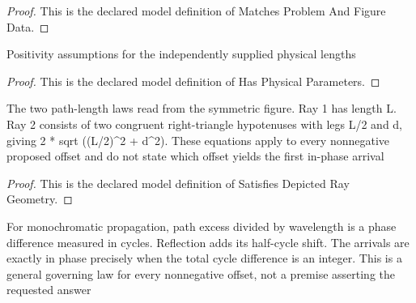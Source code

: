 \begin{proof}
  This is the declared model definition of Matches Problem And Figure Data.
\end{proof}
\begin{definition}
  \label{def:physics:phyx-mini-0323:phyxminiproblems-problemphyxmini0323-hasphysicalparameters}
  Positivity assumptions for the independently supplied physical lengths
\end{definition}
\begin{proof}
  This is the declared model definition of Has Physical Parameters.
\end{proof}
\begin{definition}
  \label{def:physics:phyx-mini-0323:phyxminiproblems-problemphyxmini0323-satisfiesdepictedraygeometry}
  The two path-length laws read from the symmetric figure. Ray 1 has length L. Ray 2 consists of two congruent right-triangle hypotenuses with legs L/2 and d, giving 2 * sqrt ((L/2)\textasciicircum{}2 + d\textasciicircum{}2). These equations apply to every nonnegative proposed offset and do not state which offset yields the first in-phase arrival
\end{definition}
\begin{proof}
  This is the declared model definition of Satisfies Depicted Ray Geometry.
\end{proof}
\begin{definition}
  \label{def:physics:phyx-mini-0323:phyxminiproblems-problemphyxmini0323-satisfiespropagationandreflectionphaselaw}
  For monochromatic propagation, path excess divided by wavelength is a phase difference measured in cycles. Reflection adds its half-cycle shift. The arrivals are exactly in phase precisely when the total cycle difference is an integer. This is a general governing law for every nonnegative offset, not a premise asserting the requested answer
\end{definition}
